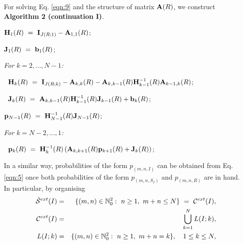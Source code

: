 \documentclass[preprint,12pt]{elsarticle}
\begin{document}
\par\noindent For solving Eq. \eqref{eqn:9} and the structure of matrix ${\bf A}(R)$, we construct {\bf Algorithm 2 (continuation I)}.

\vspace{0.5cm}
\par {}
\begin{description}
  \item ${\bf H}_1(R) ~=~ {\bf I}_{J(R;1)}-{\bf A}_{1,1}(R)$;
  \item ${\bf J}_1(R) ~=~ {\bf b}_1(R)$;
  \item \it For $k=2,\dots,N-1$:
  \item $~$\hspace{0.5cm} ${\bf H}_k(R) ~=~ {\bf I}_{J(R;k)}-{\bf A}_{k,k}(R)-{\bf A}_{k,k-1}(R){\bf H}_{k-1}^{-1}(R){\bf A}_{k-1,k}(R)$;
  \item $~$\hspace{0.5cm} ${\bf J}_k(R) ~=~ {\bf A}_{k,k-1}(R){\bf H}_{k-1}^{-1}(R){\bf J}_{k-1}(R)+{\bf b}_k(R)$;
  \item ${\bf p}_{N-1}(R) ~=~ {\bf H}_{N-1}^{-1}(R){\bf J}_{N-1}(R)$;
  \item \it For $k=N-2,\dots,1$:
  \item $~$\hspace{0.5cm} ${\bf p}_k(R) ~=~ {\bf H}_k^{-1}(R)\left({\bf A}_{k,k+1}(R){\bf p}_{k+1}(R)+{\bf J}_k(R)\right)$;
\end{description}
\vspace{0.5cm}

\par In a similar way, probabilities of the form $p_{(m,n,I)}$ can be obtained from Eq. \eqref{eqn:5} once both probabilities of the form
$p_{(m,n,S_I)}$ and $p_{(m,n,R)}$ are in hand. In particular, by organising
\begin{eqnarray*}
 {\cal \tilde S}^{ext}(I) &=& \{(m,n)\in\mathbb{N}_0^2:\ n\geq1,\ m+n\leq N\} \ = \ {\cal C}^{ext}(I),\\
 {\cal C}^{ext}(I) &=& \bigcup\limits_{k=1}^{N} L(I;k),\\
 L(I;k) &=& \{(m,n)\in\mathbb{N}_0^2:\ n\geq1,\ m+n=k\},\quad 1\leq k\leq N,
\end{eqnarray*}
\end{document}
